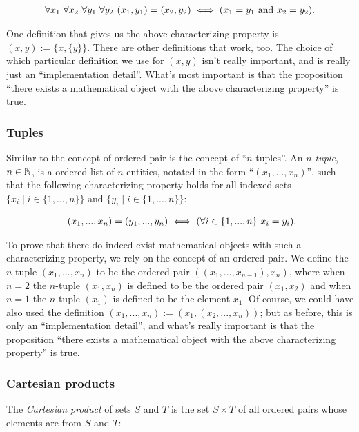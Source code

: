 \begin{align*}
    \forall x_1 \text{ } \forall x_2 \text{ } \forall y_1 \text{ } \forall y_2 \text{ } (x_1, y_1) = (x_2, y_2) \iff (x_1 = y_1 \text{ and } x_2 = y_2).
\end{align*}

One definition that gives us the above characterizing property is $(x, y) := \{x, \{y\}\}$. There are other definitions that work, too. The choice of which particular definition we use for $(x, y)$ isn't really important, and is really just an ``implementation detail''. What's most important is that the proposition ``there exists a mathematical object with the above characterizing property'' is true.

\subsubsection*{Tuples}

Similar to the concept of ordered pair is the concept of ``$n$-tuples''. An \textit{$n$-tuple}, $n \in \mathbb{N}$, is a ordered list of $n$ entities, notated in the form ``$(x_1, ..., x_n)$'', such that the following characterizing property holds for all indexed sets $\{x_i \mid i \in \{1, ..., n\}\}$ and $\{y_i \mid i \in \{1, ..., n\}\}$:

\begin{align*}
     \text{ } (x_1, ..., x_n) = (y_1, ..., y_n) \iff (\forall i \in \{1, ..., n\} \text{ } x_i = y_i).
\end{align*}

To prove that there do indeed exist mathematical objects with such a characterizing property, we rely on the concept of an ordered pair. We define the $n$-tuple $(x_1, ..., x_n)$ to be the ordered pair $((x_1, ..., x_{n - 1}), x_n)$, where when $n = 2$ the $n$-tuple $(x_1, x_n)$ is defined to be the ordered pair $(x_1, x_2)$ and when $n = 1$ the $n$-tuple $(x_1)$ is defined to be the element $x_1$. Of course, we could have also used the definition $(x_1, ..., x_n) := (x_1, (x_2, ..., x_n))$; but as before, this is only an ``implementation detail'', and what's really important is that the proposition ``there exists a mathematical object with the above characterizing property'' is true.

\subsubsection*{Cartesian products}

The \textit{Cartesian product} of sets $S$ and $T$ is the set $S \times T$ of all ordered pairs whose elements are from $S$ and $T$:

